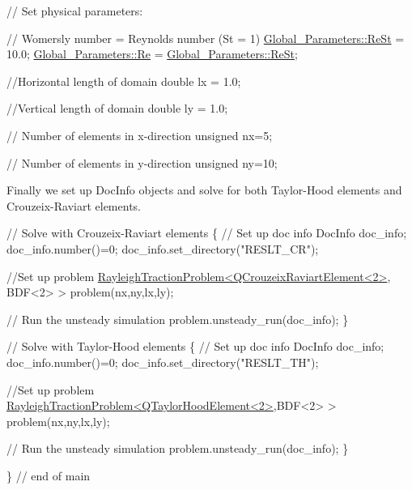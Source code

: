 \begin{DoxyCodeInclude}


 \textcolor{comment}{// Set physical parameters:}

 \textcolor{comment}{// Womersly number = Reynolds number (St = 1)}
 \hyperlink{namespaceGlobal__Parameters_a7a59a32365e87566069e458dc83bd18a}{Global\_Parameters::ReSt} = 10.0;
 \hyperlink{namespaceGlobal__Parameters_a9d72e94a9305c6a310940a6a427ebe06}{Global\_Parameters::Re} = \hyperlink{namespaceGlobal__Parameters_a7a59a32365e87566069e458dc83bd18a}{Global\_Parameters::ReSt};

 \textcolor{comment}{//Horizontal length of domain}
 \textcolor{keywordtype}{double} lx = 1.0;

 \textcolor{comment}{//Vertical length of domain}
 \textcolor{keywordtype}{double} ly = 1.0;

 \textcolor{comment}{// Number of elements in x-direction}
 \textcolor{keywordtype}{unsigned} nx=5;

 \textcolor{comment}{// Number of elements in y-direction}
 \textcolor{keywordtype}{unsigned} ny=10;

\end{DoxyCodeInclude}


Finally we set up {\ttfamily Doc\+Info} objects and solve for both Taylor-\/\+Hood elements and Crouzeix-\/\+Raviart elements.


\begin{DoxyCodeInclude}

 \textcolor{comment}{// Solve with Crouzeix-Raviart elements}
 \{
  \textcolor{comment}{// Set up doc info}
  DocInfo doc\_info;
  doc\_info.number()=0;
  doc\_info.set\_directory(\textcolor{stringliteral}{"RESLT\_CR"});
  
  \textcolor{comment}{//Set up problem}
  \hyperlink{classRayleighTractionProblem}{RayleighTractionProblem<QCrouzeixRaviartElement<2>},
      BDF<2> > 
   problem(nx,ny,lx,ly);
  
  \textcolor{comment}{// Run the unsteady simulation}
  problem.unsteady\_run(doc\_info);
 \}


 \textcolor{comment}{// Solve with Taylor-Hood elements}
 \{
  \textcolor{comment}{// Set up doc info}
  DocInfo doc\_info;
  doc\_info.number()=0;
  doc\_info.set\_directory(\textcolor{stringliteral}{"RESLT\_TH"});

  \textcolor{comment}{//Set up problem}
  \hyperlink{classRayleighTractionProblem}{RayleighTractionProblem<QTaylorHoodElement<2>},BDF<2> > 
   problem(nx,ny,lx,ly);
  
  \textcolor{comment}{// Run the unsteady simulation}
  problem.unsteady\_run(doc\_info);
 \}

\} \textcolor{comment}{// end of main}

\end{DoxyCodeInclude}




